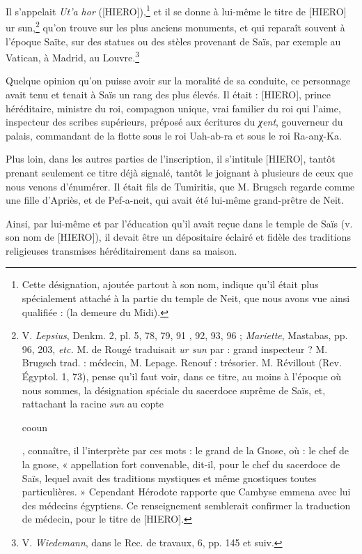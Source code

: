 \documentclass[a4paper, 11pt, oneside]{article}
\begin{document}
Il s'appelait \emph{Ut'a hor} ([HIERO]),\footnote{Cette désignation, ajoutée partout à son nom, indique qu'il était plus spécialement attaché à la partie du temple de Neit, que nous avons vue ainsi qualifiée : (la demeure du Midi).} et il se donne à lui-même le titre de [HIERO] ur sun,\footnote{V. \emph{Lepsius}, Denkm. 2, pl. 5, 78, 79, 91 , 92, 93, 96 ; \emph{Mariette}, Mastabas, pp. 96, 203, \emph{etc.} M. de Rougé traduisait \emph{ur sun} par : grand inspecteur ? M. Brugsch trad. : médecin, M. Lepage. Renouf : trésorier. M. Révillout (Rev. Égyptol. 1, 73), pense qu'il faut voir, dans ce titre, au moins à l'époque où nous sommes, la désignation spéciale du sacerdoce suprême de Saïs, et, rattachant la racine \emph{sun} au copte \begin{coptic}cooun\end{coptic}, connaître, il l'interprète par ces mots : le grand de la Gnose, où : le chef de la gnose, « appellation fort convenable, dit-il, pour le chef du sacerdoce de Saïs, lequel avait des traditions mystiques et même gnostiques toutes particulières. » Cependant Hérodote rapporte que Cambyse emmena avec lui des médecins égyptiens. Ce renseignement semblerait confirmer la traduction de médecin, pour le titre de [HIERO].} qu'on trouve sur les plus anciens monuments, et qui reparaît souvent à l'époque Saïte, sur des statues ou des stèles provenant de Saïs, par exemple au Vatican, à Madrid, au Louvre.\footnote{V. \emph{Wiedemann}, dans le Rec. de travaux, 6, pp. 145 et suiv.}

Quelque opinion qu'on puisse avoir sur la moralité de sa conduite, ce personnage avait tenu et tenait à Saïs un rang des plus élevés. Il était : [HIERO], prince héréditaire, ministre du roi, compagnon unique, vrai familier du roi qui l'aime, inspecteur des scribes supérieurs, préposé aux écritures du \emph{χent}, gouverneur du palais, commandant de la flotte sous le roi Uah-ab-ra et sous le roi Ra-anχ-Ka.

Plus loin, dans les autres parties de l'inscription, il s'intitule [HIERO], tantôt prenant seulement ce titre déjà signalé, tantôt le joignant à plusieurs de ceux que nous venons d'énumérer. Il était fils de Tumiritis, que M. Brugsch regarde comme une fille d'Apriès, et de Pef-a-neit, qui avait été lui-même grand-prêtre de Neit.

Ainsi, par lui-même et par l'éducation qu'il avait reçue dans le temple de Saïs (v. son nom de [HIERO]), il devait être un dépositaire éclairé et fidèle des traditions religieuses transmises héréditairement dans sa maison.
\end{document}
